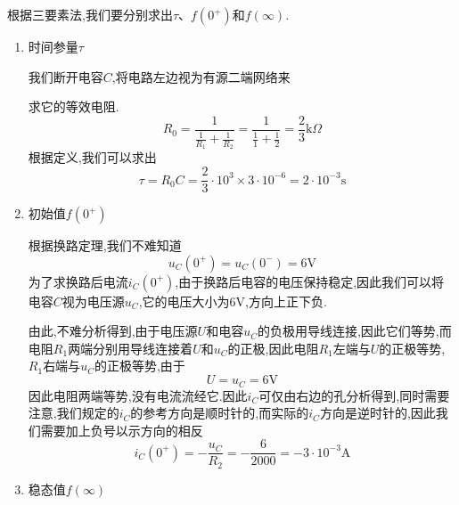 \begin{solution}
    根据三要素法,我们要分别求出$\tau $、$f\left( 0^+ \right) $和$f\left( \infty \right) $.

    \begin{enumerate}
        \item[\circledtext{1}]  时间参量$\tau $
        
        \Par 我们断开电容$C$,将电路左边视为有源二端网络来

        求它的等效电阻.
        \begin{equation*}
            R_0=\frac{1}{\frac{1}{R_1}+\frac{1}{R_2}}=\frac{1}{\frac{1}{1}+\frac{1}{2}}=\frac{2}{3}\mathrm{k}\Omega 
        \end{equation*}
        根据定义,我们可以求出
        \begin{equation}
            \tau =R_0C=\frac{2}{3}\cdot 10^3\times 3\cdot 10^{-6}=2\cdot 10^{-3}\mathrm{s}
        \end{equation}

        \item[\circledtext{2}]  初始值$f\left( 0^+ \right) $
        
        根据换路定理,我们不难知道
        \begin{equation}
            u_C\left( 0^+ \right) =u_C\left( 0^- \right) =6\mathrm{V}
        \end{equation}
        为了求换路后电流$i_C\left( 0^+ \right) $,由于换路后电容的电压保持稳定,因此我们可以将电容$C$视为电压源$u_C$,它的电压大小为$6\mathrm{V}$,方向上正下负.
        
        \Par 由此,不难分析得到,由于电压源$U$和电容$u_C$的负极用导线连接,因此它们等势,而电阻$R_1$两端分别用导线连接着$U$和$u_C$的正极,因此电阻$R_1$左端与$U$的正极等势,$R_1$右端与$u_C$的正极等势,由于
        \begin{equation*}
            U=u_C=6\mathrm{V}
        \end{equation*}
        因此电阻两端等势,没有电流流经它.因此$i_C$可仅由右边的孔分析得到,同时需要注意,我们规定的$i_C$的参考方向是顺时针的,而实际的$i_C$方向是逆时针的,因此我们需要加上负号以示方向的相反
        \begin{equation}
            i_C\left( 0^+ \right) =-\frac{u_C}{R_2}=-\frac{6}{2000}=-3\cdot 10^{-3}\mathrm{A}
        \end{equation}

        \item[\circledtext{3}]  稳态值$f\left( \infty \right) $
    

\end{enumerate}
\end{solution}
